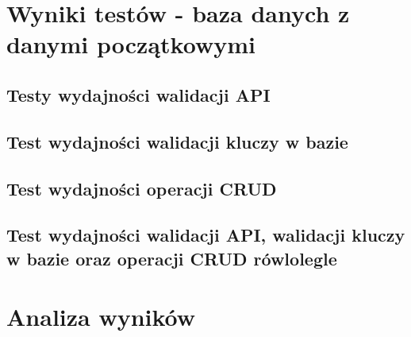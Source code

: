 \newpage
\section{Wyniki testów - baza danych z danymi początkowymi}
\subsection{Testy wydajności walidacji API}

\clearpage

\newpage
\subsection{Test wydajności walidacji kluczy w bazie}

\clearpage

\newpage
\subsection{Test wydajności operacji CRUD}

\clearpage

\newpage
\subsection{Test wydajności walidacji API, walidacji kluczy w bazie oraz operacji CRUD rówlolegle }

\clearpage

\newpage
\section{Analiza wyników}
